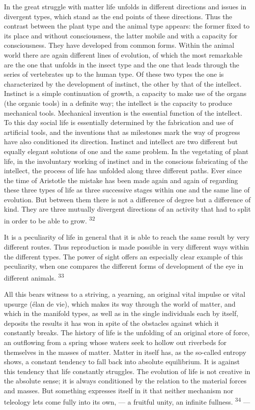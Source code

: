 \documentclass[12pt,a4paper,openany]{book}
\newcommand{\opage}[1]{\marginnote{\footnotesize\textit{[#1]}}}
\newcommand{\nm}[1]{\unskip\textsuperscript{#1}}
\begin{document}
In the great struggle with matter life unfolds in different directions and issues in divergent types, which stand as the end points of these directions. Thus the contrast between the plant type and the animal type appears: the former fixed to its place and without consciousness, the latter mobile and with a capacity for consciousness. They have developed from common forms. Within the animal world there are again different lines of evolution, of which the most remarkable are the one that unfolds in the insect type and the one that leads through the series of vertebrates up to the human type. Of these two types the one is characterized by the development of instinct, the other by that of the intellect. Instinct is a simple continuation of growth, a capacity to make use of the organs (the organic tools) in a definite way; the intellect is the capacity to produce mechanical tools. Mechanical invention is the essential function of the intellect. To this day social life is essentially determined by the fabrication and use of artificial tools, and the inventions that as milestones mark the way of progress have also conditioned its direction. Instinct and intellect are two different but equally elegant solutions of one and the same problem.
\opage{40}In the vegetating of plant life, in the involuntary working of instinct and in the conscious fabricating of the intellect, the process of life has unfolded along three different paths. Ever since the time of Aristotle the mistake has been made again and again of regarding these three types of life as three successive stages within one and the same line of evolution. But between them there is not a difference of degree but a difference of kind. They are three mutually divergent directions of an activity that had to split in order to be able to grow. \nm{32}

It is a peculiarity of life in general that it is able to reach the same result by very different routes. Thus reproduction is made possible in very different ways within the different types. The power of sight offers an especially clear example of this peculiarity, when one compares the different forms of development of the eye in different animals. \nm{33}

All this bears witness to a striving, a yearning, an original vital impulse or vital upsurge (élan de vie), which makes its way through the world of matter, and which in the manifold types, as well as in the single individuals each by itself, deposits the results it has won in spite of the obstacles against which it constantly breaks. The history of life is the unfolding of an original store of force, an outflowing from a spring whose waters seek to hollow out riverbeds for themselves in the masses of matter. Matter in itself has, as the so-called entropy shows, a constant tendency to fall back into absolute equilibrium. It is against this tendency that life constantly struggles. The evolution of life is not creative in the absolute sense; it is always conditioned by the relation to the material forces and masses. But something expresses itself in it that neither mechanism nor teleology lets come fully into its own, --- a fruitful unity, an infinite fullness. \nm{34} ---
\end{document}
